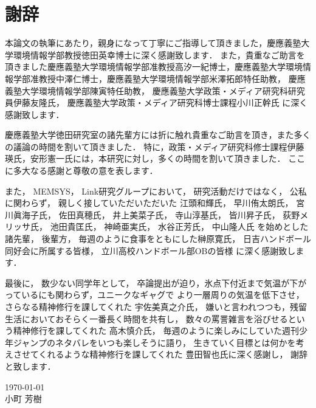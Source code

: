 \chapter*{謝辞}
本論文の執筆にあたり，親身になって丁寧にご指導して頂きました，慶應義塾大学環境情報学部教授徳田英幸博士に深く感謝致します．
また，貴重なご助言を頂きました慶應義塾大学環境情報学部准教授高汐一紀博士，慶應義塾大学環境情報学部准教授中澤仁博士，慶應義塾大学環境情報学部米澤拓郎特任助教，
慶應義塾大学環境情報学部陳寅特任助教，
慶應義塾大学政策・メディア研究科研究員伊藤友隆氏，
慶應義塾大学政策・メディア研究科博士課程小川正幹氏
に深く感謝致します．

慶應義塾大学徳田研究室の諸先輩方には折に触れ貴重なご助言を頂き，また多くの議論の時間を割いて頂きました．
特に，政策・メディア研究科修士課程伊藤瑛氏，安形憲一氏には，本研究に対し，多くの時間を割いて頂きました．
ここに多大なる感謝と尊敬の意を表します．

また，
MEMSYS，
Link研究グループにおいて，
研究活動だけではなく，
公私に関わらず，
親しく接していただいただいた
江頭和輝氏，
早川侑太朗氏，
宮川眞海子氏，
佐田真穂氏，
井上美菜子氏，
寺山淳基氏，
皆川昇子氏，
荻野メリッサ氏，
池田貴匡氏，
神崎亜実氏，
水谷正芳氏，
中山隆人氏
を始めとした諸先輩，
後輩方，
毎週のように食事をともにした榊原寛氏，
日吉ハンドボール同好会に所属する皆様，
立川高校ハンドボール部OBの皆様
に深く感謝致します．

最後に，
数少ない同学年として，
卒論提出が迫り，氷点下付近まで気温が下がっているにも関わらず，ユニークなギャグで
より一層周りの気温を低下させ，さらなる精神修行を課してくれた
宇佐美真之介氏，
嫌いと言われつつも，残留生活においておそらく一番長く時間を共有し，
数々の罵詈雑言を浴びせるという精神修行を課してくれた
高木慎介氏，
毎週のように楽しみにしていた週刊少年ジャンプのネタバレをいつも楽しそうに語り，
生きていく目標とは何かを考えさせてくれるような精神修行を課してくれた
豊田智也氏に深く感謝し，
謝辞と致します．




\begin{flushright}
\today\\
小町 芳樹
\end{flushright}
